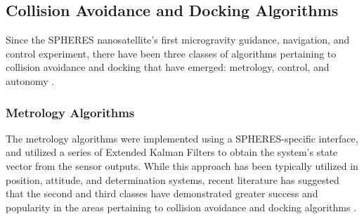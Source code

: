 \documentclass[journal, 10pt]{IEEEtran}
\begin{document}
\subsection{Collision Avoidance and Docking Algorithms}
Since the SPHERES nanosatellite's first microgravity guidance, navigation, and control experiment, there have been three classes of algorithms pertaining to collision avoidance and docking that have emerged: metrology, control, and autonomy \cite{SPHERES_form}.

\subsubsection{Metrology Algorithms}
The metrology algorithms were implemented using a SPHERES-specific interface, and utilized a series of Extended Kalman Filters to obtain the system's state vector from the sensor outputs. While this approach has been typically utilized in position, attitude, and determination systems, recent literature has suggested that the second and third classes have demonstrated greater success and popularity in the areas pertaining to collision avoidance and docking algorithms \cite{SPHERES_form}.
\end{document}
